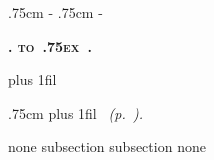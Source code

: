 
\setlength\parindent{0pt}

\begingroup
\newcommand*{\DotsAndPage}
{\nobreak\leaders\hbox{\bfseries\normalsize\hbox to .75ex {\hss.\hss}}%
\hfill\nobreak
\makebox[\rightskip][r]{\bfseries\normalsize\etocpage}\par}

{\parindent 0pt
\nobreak
\etocskipfirstprefix}
{\pagebreak[3]\bigskip}
{\large\rmfamily\bfseries\scshape\centering
{}\etocname\par}
{}

{\leftskip 0pt \rightskip .75cm \parfillskip-\rightskip
\nobreak\medskip
\etocskipfirstprefix}
{\leftskip 0pt \rightskip .75cm \parfillskip-\rightskip
\pagebreak[1]\smallskip}
{\normalsize\rmfamily\bfseries\scshape
\etocnumber. \etocname\DotsAndPage }
{\parfillskip 0pt plus 1fil\relax }

{\rightskip .75cm \parfillskip 0pt plus 1fil\relax
\nobreak\smallskip}
{}
{\footnotesize\sffamily\mdseries\itshape
\etocname{}~(p.~\etocpage). }
{\par\medskip}

   {none}
 {subsection}
 {subsection}
 {none}

\etocsettocstyle {\centering\LARGE\textsc{\contentsname}\par\nobreak\medskip}{}

\tableofcontents
\endgroup

\newpage
